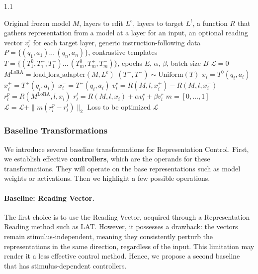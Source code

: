 \begin{algorithm}[t]
\caption{Low-Rank Representation Adaptation (LoRRA) with Contrast Vector Loss}
\label{alg:lorra}
\begin{spacing}{1.1}
\begin{algorithmic}[1]
\Require Original frozen model $M$, layers to edit $L^e$, layers to target $L^t$, a function $R$ that gathers representation from a model at a layer for an input, an optional reading vector $v_l^r$ for each target layer, generic instruction-following data $P=\{(q_1,a_1) \ldots\, (q_n,a_n)\}$, contrastive templates $T = \{(T^0_1, T^+_1, T^-_1) \ldots\, (T^0_m, T^+_m, T^-_m)\}$, epochs $E$, $\alpha$, $\beta$, batch size $B$
\State $\mathcal{L} = 0$ 
\State $M^{\text{LoRA}} = \text{load\_lora\_adapter}(M, L^e)$
        \State $(T^+, T^-) \sim \text{Uniform}(T)$
        \State $x_i = T^0(q_i, a_i)$ 
        \State $x_i^+ = T^+(q_i, a_i)$ 
        \State $x_i^- = T^-(q_i, a_i)$ 
            \State $v_l^c = R(M, l, x_i^+) - R(M, l, x_i^-)$ \label{line:contrast_vectors} 
            \State $r^p_l = R(M^{\text{LoRA}}, l, x_i)$ 
            \State $r^t_l = R(M, l, x_i) + \alpha v_l^c + \beta v_l^r$  
            \State $m = [0, \ldots, 1]$ 
            \State $\mathcal{L} = \mathcal{L} + \|m(r^p_l - r^t_l)\|_2$
        \EndFor
    \EndFor
\EndLoop
\Ensure Loss to be optimized $\mathcal{L}$
\end{algorithmic}
\end{spacing}
\end{algorithm}


\subsubsection{Baseline Transformations} \label{subsec:control_baselines}
We introduce several baseline transformations for Representation Control. First, we establish effective \textbf{controllers}, which are the operands for these transformations. They will operate on the base representations such as model weights or activations. Then we highlight a few possible operations.




\paragraph{Baseline: Reading Vector.}
The first choice is to use the Reading Vector, acquired through a Representation Reading method such as LAT. However, it possesses a drawback: the vectors remain stimulus-independent, meaning they consistently perturb the representations in the same direction, regardless of the input. This limitation may render it a less effective control method. Hence, we propose a second baseline that has stimulus-dependent controllers.

